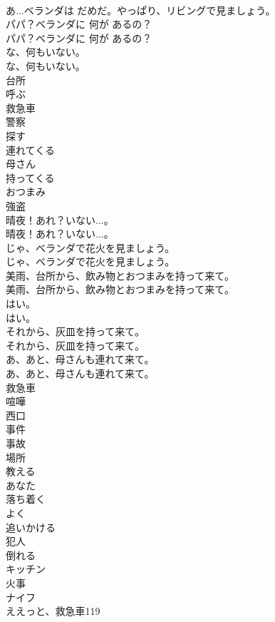 \documentclass[8pt]{extreport}
\begin{document}
\begin{CJK}{UTF8}{min}
\\	あ...ベランダは だめだ。やっぱり、リビングで見ましょう。 
\\	パパ？ベランダに 何が あるの？	
\\	パパ？ベランダに 何が あるの？ 
\\	な、何もいない。	
\\	な、何もいない。 
\\	台所
\\	呼ぶ
\\	救急車
\\	警察
\\	探す
\\	連れてくる
\\	母さん
\\	持ってくる
\\	おつまみ
\\	強盗
\\	晴夜！あれ？いない...。	
\\	晴夜！あれ？いない...。 
\\	じゃ、ベランダで花火を見ましょう。	
\\	じゃ、ベランダで花火を見ましょう。 
\\	美雨、台所から、飲み物とおつまみを持って来て。	
\\	美雨、台所から、飲み物とおつまみを持って来て。 
\\	はい。	
\\	はい。 
\\	それから、灰皿を持って来て。	
\\	それから、灰皿を持って来て。 
\\	あ、あと、母さんも連れて来て。	
\\	あ、あと、母さんも連れて来て。 
\\	救急車
\\	喧嘩
\\	西口
\\	事件
\\	事故
\\	場所
\\	教える
\\	あなた
\\	落ち着く
\\	よく
\\	追いかける
\\	犯人
\\	倒れる
\\	キッチン
\\	火事
\\	ナイフ
\\	ええっと、救急車119	

\end{CJK}
\end{document}
